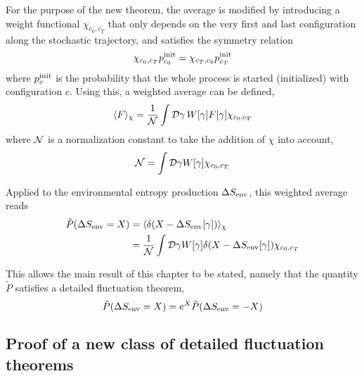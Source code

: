For the purpose of the new theorem, the average  is modified by introducing a weight functional \(\chi_{c_0,c_T}\) that only depends on the very first and last configuration along the stochastic trajectory, and satisfies the symmetry relation
%
\begin{align}
	\label{eqn:chi symmetry}
	\chi_{c_0,c_T}p_{c_0}^{\text{init}} = \chi_{c_T,c_0}p_{c_T}^{\text{init}}
\end{align}
%
where \(p_c^{\text{init}}\) is the probability that the whole process is started (initialized) with configuration \(c\). Using this, a weighted average can be defined,
%
\begin{align}
	\label{eqn:weighted functional average}
	\langle F\rangle_\chi
	= \frac1{\mathcal{N}} \int \mathcal{D} \gamma\, W[\gamma] F[\gamma] \chi_{c_0,c_T}
\end{align}
%
where \(\mathcal{N}\) is a normalization constant to take the addition of \(\chi\) into account,
%
\begin{align}
	\mathcal{N} = \int\mathcal{D}\gamma W[\gamma] \chi_{c_0,c_T}
\end{align}


Applied to the environmental entropy production \(\Delta S_\text{env}\), this weighted average reads
%
\begin{equation}
	\begin{split}
	\label{eqn:P(SEnv)}
	\tilde P(\Delta S_\text{env} = X)
	&= \langle \delta(X-\Delta S_\text{env}[\gamma])\rangle_\chi \\
	&= \frac1{\mathcal{N}} \int\mathcal{D}\gamma W[\gamma] \delta(X-\Delta S_\text{env}[\gamma]) \chi_{c_0,c_T}
	\end{split}
\end{equation}

This allows the main result of this chapter to be stated, namely that the quantity \(\tilde P\) satisfies a detailed fluctuation theorem,
%
\begin{equation}
	\label{eqn:SEnv fluctuation theorem}
	\tilde P(\Delta S_\text{env} = X) = e^X \tilde P(\Delta S_\text{env} = -X)
\end{equation}




\subsection{Proof of a new class of detailed fluctuation theorems}



